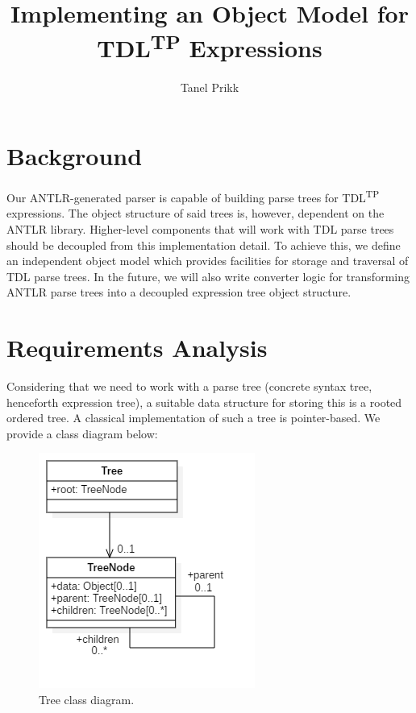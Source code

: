 \documentclass[12pt,oneside,a4paper,notitlepage]{report}
\title{
	Implementing an Object Model for TDL\textsuperscript{TP} Expressions
}
\author{Tanel Prikk}
\begin{document}
	\maketitle

	\section*{Background}
	\par Our ANTLR-generated parser is capable of building parse trees for TDL\textsuperscript{TP} expressions. The object structure of said trees is, however, dependent on the ANTLR library. Higher-level components that will work with TDL parse trees should be decoupled from this implementation detail. To achieve this, we define an independent object model which provides facilities for storage and traversal of TDL parse trees. In the future, we will also write converter logic for transforming ANTLR parse trees into a decoupled expression tree object structure.

	\newpage

	\section*{Requirements Analysis}
	\par Considering that we need to work with a parse tree (concrete syntax tree, henceforth expression tree), a suitable data structure for storing this is a rooted ordered tree. A classical implementation of such a tree is pointer-based. We provide a class diagram below:

	\begin{figure}[h]
		\begin{center}
		\includegraphics{Models/BasicTree}
		\end{center}
		\caption{Tree class diagram.}
		\label{fig:basic-tree}
	\end{figure}
\end{document}
